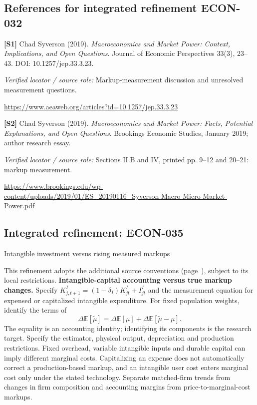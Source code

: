 \documentclass[11pt,a4paper]{article}
\begin{document}
\subsection*{References for integrated refinement ECON-032}
{\footnotesize\raggedright
\par\noindent\textbf{[S1]} Chad Syverson (2019). \emph{Macroeconomics and Market Power: Context, Implications, and Open Questions}. Journal of Economic Perspectives 33(3), 23–43. DOI: 10.1257/jep.33.3.23.\par \textit{Verified locator / source role:} Markup-measurement discussion and unresolved measurement questions.\par \url{https://www.aeaweb.org/articles?id=10.1257/jep.33.3.23}\par\smallskip
\par\noindent\textbf{[S2]} Chad Syverson (2019). \emph{Macroeconomics and Market Power: Facts, Potential Explanations, and Open Questions}. Brookings Economic Studies, January 2019; author research essay.\par \textit{Verified locator / source role:} Sections II.B and IV, printed pp. 9–12 and 20–21: markup measurement.\par \url{https://www.brookings.edu/wp-content/uploads/2019/01/ES_20190116_Syverson-Macro-Micro-Market-Power.pdf}\par\smallskip
}

\subsection*{Integrated refinement: ECON-035}
{\sffamily\small\color{muted}Intangible investment versus rising measured markups\par}
This refinement adopts the additional source conventions
(page~\pageref{audited:conventions}), subject to its local restrictions.
\textbf{Intangible-capital accounting versus true markup changes.}
Specify $K^I_{j,t+1}=(1-\delta_I)K^I_{jt}+I^I_{jt}$ and the measurement equation
for expensed or capitalized intangible expenditure. For fixed population weights,
identify the terms of
\[
\Delta\mathbb E[\widetilde\mu]
=\Delta\mathbb E[\mu]+\Delta\mathbb E[\widetilde\mu-\mu].
\]
The equality is an accounting identity; identifying its components is the
research target. Specify the estimator, physical output, depreciation and
production restrictions. Fixed overhead, variable intangible inputs and durable
capital can imply different marginal costs. Capitalizing an expense does not
automatically correct a production-based markup, and an intangible user cost
enters marginal cost only under the stated technology. Separate matched-firm
trends from changes in firm composition and accounting margins from
price-to-marginal-cost markups.
\end{document}
